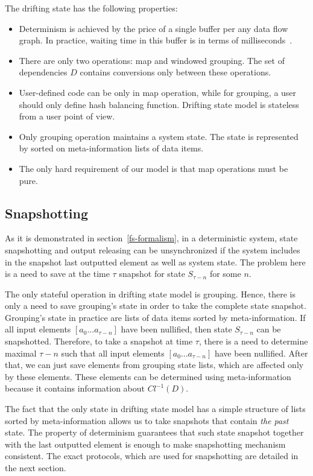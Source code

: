 The drifting state has the following properties:
\begin{itemize}
    \item Determinism is achieved by the price of a single buffer per any data flow graph. In practice, waiting time in this buffer is in terms of milliseconds~\cite{we2018adbis}.
    \item There are only two operations: map and windowed grouping. The set of dependencies $D$ contains conversions only between these operations.
    \item User-defined code can be only in map operation, while for grouping, a user should only define hash balancing function. Drifting state model is stateless from a user point of view.
    \item Only grouping operation maintains a system state. The state is represented by sorted on meta-information lists of data items.
    \item The only hard requirement of our model is that map operations must be pure.
\end{itemize}

\subsection{Snapshotting}

As it is demonstrated in section~\ref{fs-formalism}, in a deterministic system, state snapshotting and output releasing can be unsynchronized if the system includes in the snapshot last outputted element as well as system state. The problem here is a need to save at the time $\tau$ snapshot for state $S_{\tau-n}$ for some $n$.

The only stateful operation in drifting state model is grouping. Hence, there is only a need to save grouping's state in order to take the complete state snapshot. Grouping's state in practice are lists of data items sorted by meta-information. If all input elements $[a_{0}...a_{\tau-n}]$ have been nullified, then state $S_{\tau-n}$ can be snapshotted. Therefore, to take a snapshot at time $\tau$, there is a need to determine maximal $\tau-n$ such that all input elements $[a_{0}...a_{\tau-n}]$ have been nullified. After that, we can just save elements from grouping state lists, which are affected only by these elements. These elements can be determined using meta-information because it contains information about $Cl^{-1}(D)$.

The fact that the only state in drifting state model has a simple structure of lists sorted by meta-information allows us to take snapshots that contain {\em the past} state. The property of determinism guarantees that such state snapshot together with the last outputted element is enough to make snapshotting mechanism consistent. The exact protocols, which are used for snapshotting are detailed in the next section.  

